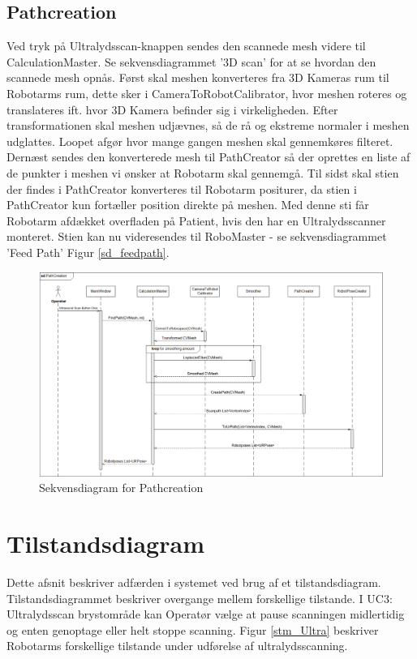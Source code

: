 {\subsection{Pathcreation}
Ved tryk på Ultralydsscan-knappen sendes den scannede mesh videre til CalculationMaster. Se sekvensdiagrammet '3D scan' for at se hvordan den scannede mesh opnås.
Først skal meshen konverteres fra 3D Kameras rum til Robotarms rum, dette sker i CameraToRobotCalibrator, hvor meshen roteres og translateres ift. hvor 3D Kamera befinder sig i virkeligheden.
Efter transformationen skal meshen udjævnes, så de rå og ekstreme normaler i meshen udglattes. Loopet afgør hvor mange gangen meshen skal gennemkøres filteret. Dernæst sendes den konverterede mesh til PathCreator så der oprettes en liste af de punkter i meshen vi ønsker at Robotarm skal gennemgå.
Til sidst skal stien der findes i PathCreator konverteres til Robotarm positurer, da stien i PathCreator kun fortæller position direkte på meshen. Med denne sti får Robotarm afdækket overfladen på Patient, hvis den har en Ultralydsscanner monteret.
Stien kan nu videresendes til RoboMaster - se sekvensdiagrammet 'Feed Path' Figur \ref{sd_feedpath}.

\begin{figure}[H]
    \centering
    \includegraphics[width=1.4\textwidth, angle =90]{figurer/d/Design/Sequence/sd_pathcreation}
    \caption{Sekvensdiagram for Pathcreation}
    \label{sd_pathcreation}
\end{figure}
\newpage

\section{Tilstandsdiagram}
Dette afsnit beskriver adfærden i systemet ved brug af et tilstandsdiagram. Tilstandsdiagrammet beskriver overgange mellem forskellige tilstande. I UC3: Ultralydsscan brystområde kan Operatør vælge at pause scanningen midlertidig og enten genoptage eller helt stoppe scanning. Figur \ref{stm_Ultra} beskriver Robotarms forskellige tilstande under udførelse af ultralydsscanning. 

}
